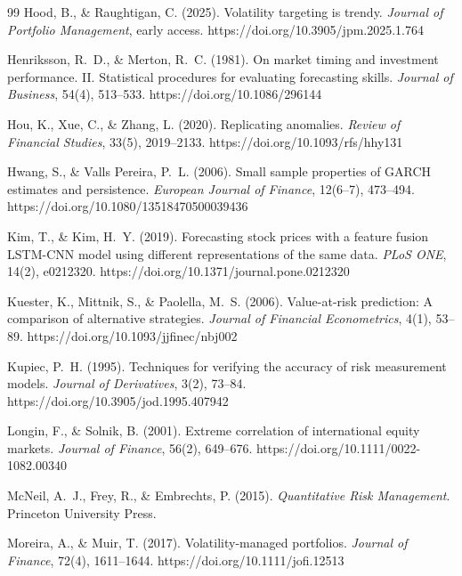 \documentclass[12pt,a4paper]{article}
\begin{document}
\begin{thebibliography}{99}
Hood, B., \& Raughtigan, C. (2025). Volatility targeting is trendy. \textit{Journal of Portfolio Management}, early access. https://doi.org/10.3905/jpm.2025.1.764

Henriksson, R.~D., \& Merton, R.~C. (1981). On market timing and investment performance. II. Statistical procedures for evaluating forecasting skills. \textit{Journal of Business}, 54(4), 513--533. https://doi.org/10.1086/296144

Hou, K., Xue, C., \& Zhang, L. (2020). Replicating anomalies. \textit{Review of Financial Studies}, 33(5), 2019--2133. https://doi.org/10.1093/rfs/hhy131

Hwang, S., \& Valls Pereira, P.~L. (2006). Small sample properties of GARCH estimates and persistence. \textit{European Journal of Finance}, 12(6--7), 473--494. https://doi.org/10.1080/13518470500039436

Kim, T., \& Kim, H.~Y. (2019). Forecasting stock prices with a feature fusion LSTM-CNN model using different representations of the same data. \textit{PLoS ONE}, 14(2), e0212320. https://doi.org/10.1371/journal.pone.0212320

Kuester, K., Mittnik, S., \& Paolella, M.~S. (2006). Value-at-risk prediction: A comparison of alternative strategies. \textit{Journal of Financial Econometrics}, 4(1), 53--89. https://doi.org/10.1093/jjfinec/nbj002

Kupiec, P.~H. (1995). Techniques for verifying the accuracy of risk measurement models. \textit{Journal of Derivatives}, 3(2), 73--84. https://doi.org/10.3905/jod.1995.407942

Longin, F., \& Solnik, B. (2001). Extreme correlation of international equity markets. \textit{Journal of Finance}, 56(2), 649--676. https://doi.org/10.1111/0022-1082.00340

McNeil, A.~J., Frey, R., \& Embrechts, P. (2015). \textit{Quantitative Risk Management}. Princeton University Press.

Moreira, A., \& Muir, T. (2017). Volatility-managed portfolios. \textit{Journal of Finance}, 72(4), 1611--1644. https://doi.org/10.1111/jofi.12513


\end{thebibliography}
\end{document}
